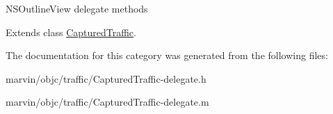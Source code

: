N\+S\+Outline\+View delegate methods 

Extends class \hyperlink{interface_captured_traffic_a819263857354e5b56f58dbe5995aaf8c}{Captured\+Traffic}.



The documentation for this category was generated from the following files\+:\begin{DoxyCompactItemize}
\item 
marvin/objc/traffic/Captured\+Traffic-\/delegate.\+h\item 
marvin/objc/traffic/Captured\+Traffic-\/delegate.\+m\end{DoxyCompactItemize}
